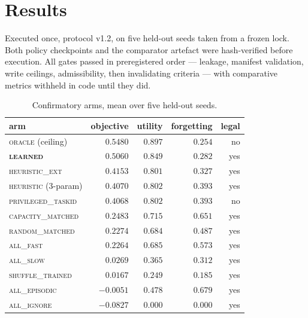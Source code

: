 \documentclass[11pt]{article}
\begin{document}
\section{Results}

Executed once, protocol v1.2, on five held-out seeds taken from a frozen lock.
Both policy checkpoints and the comparator artefact were hash-verified before
execution. All gates passed in preregistered order --- leakage, manifest
validation, write ceilings, admissibility, then invalidating criteria --- with
comparative metrics withheld in code until they did.

\begin{table}[t]
\centering
\begin{tabular}{lrrrr}
\toprule
arm & objective & utility & forgetting & legal \\
\midrule
\textsc{oracle} (ceiling) & $0.5480$ & $0.897$ & $0.254$ & no \\
\textbf{\textsc{learned}} & $\mathbf{0.5060}$ & $0.849$ & $0.282$ & yes \\
\textsc{heuristic\_ext} & $0.4153$ & $0.801$ & $0.327$ & yes \\
\textsc{heuristic} (3-param) & $0.4070$ & $0.802$ & $0.393$ & yes \\
\textsc{privileged\_taskid} & $0.4068$ & $0.802$ & $0.393$ & no \\
\textsc{capacity\_matched} & $0.2483$ & $0.715$ & $0.651$ & yes \\
\textsc{random\_matched} & $0.2274$ & $0.684$ & $0.487$ & yes \\
\textsc{all\_fast} & $0.2264$ & $0.685$ & $0.573$ & yes \\
\textsc{all\_slow} & $0.0269$ & $0.365$ & $0.312$ & yes \\
\textsc{shuffle\_trained} & $0.0167$ & $0.249$ & $0.185$ & yes \\
\textsc{all\_episodic} & $-0.0051$ & $0.478$ & $0.679$ & yes \\
\textsc{all\_ignore} & $-0.0827$ & $0.000$ & $0.000$ & yes \\
\bottomrule
\end{tabular}
\caption{Confirmatory arms, mean over five held-out seeds.}
\label{tab:arms}
\end{table}
\end{document}
